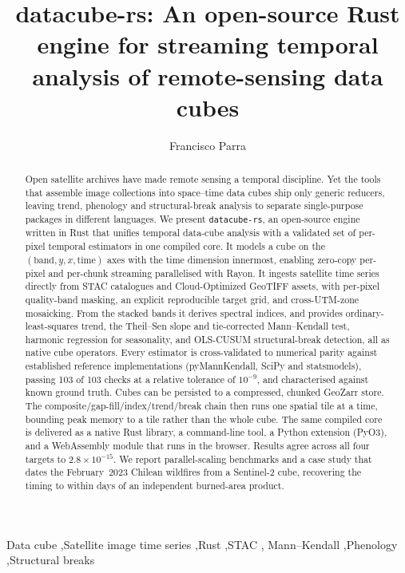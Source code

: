 \documentclass[review]{elsarticle}
\begin{document}
\begin{frontmatter}

\title{datacube-rs: An open-source Rust engine for streaming temporal
analysis of remote-sensing data cubes}

\author[usach]{Francisco Parra}
\address[usach]{Universidad de Santiago de Chile (USACH), Santiago, Chile}

\begin{abstract}
Open satellite archives have made remote sensing a temporal discipline. Yet the
tools that assemble image collections into space--time data cubes ship only
generic reducers, leaving trend, phenology and structural-break analysis to
separate single-purpose packages in different languages. We present
\texttt{datacube-rs}, an open-source engine written in Rust that unifies
temporal data-cube analysis with a validated set of per-pixel temporal
estimators in one compiled core. It models a cube on the
$(\text{band}, y, x, \text{time})$ axes with the time dimension innermost,
enabling zero-copy per-pixel and per-chunk streaming parallelised with Rayon.
It ingests satellite time series directly from STAC catalogues and
Cloud-Optimized GeoTIFF assets, with per-pixel quality-band masking, an
explicit reproducible target grid, and cross-UTM-zone mosaicking. From the
stacked bands it derives spectral indices, and provides ordinary-least-squares
trend, the Theil--Sen slope and tie-corrected Mann--Kendall test, harmonic
regression for seasonality, and OLS-CUSUM structural-break detection, all as
native cube operators. Every estimator is cross-validated to numerical parity
against established reference implementations (pyMannKendall, SciPy and
statsmodels), passing 103 of 103 checks at a relative tolerance of
$10^{-9}$, and characterised against known ground truth. Cubes can be
persisted to a compressed, chunked GeoZarr store. The
composite/gap-fill/index/trend/break chain then runs one spatial tile at a
time, bounding peak memory to a tile rather than the whole cube. The same
compiled core is delivered as a native Rust library, a command-line tool, a
Python extension (PyO3), and a WebAssembly module that runs in the browser.
Results agree across all four targets to $2.8\times10^{-15}$. We report
parallel-scaling benchmarks and a case study that dates the February~2023
Chilean wildfires from a Sentinel-2 cube, recovering the timing to within days
of an independent burned-area product.
\end{abstract}

\begin{keyword}
Data cube \sep Satellite image time series \sep Rust \sep STAC \sep
Mann--Kendall \sep Phenology \sep Structural breaks
\end{keyword}

\end{frontmatter}
\end{document}
